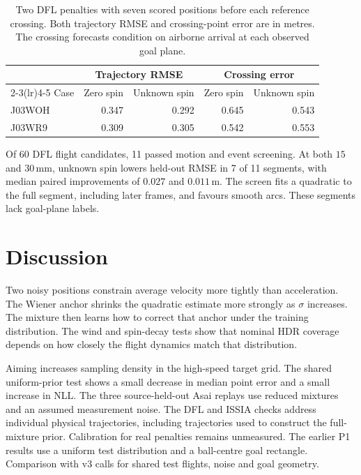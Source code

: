 \documentclass[11pt,a4paper]{article}
\begin{document}
\begin{table}[htbp]
  \centering
  \caption{Two DFL penalties with seven scored positions before each reference crossing. Both trajectory RMSE and crossing-point error are in metres. The crossing forecasts condition on airborne arrival at each observed goal plane.}
  \label{tab:dfl}
  \begin{tabular}{lrrrr}
    \toprule
    & \multicolumn{2}{c}{Trajectory RMSE} & \multicolumn{2}{c}{Crossing error} \\
    \cmidrule(lr){2-3}\cmidrule(lr){4-5}
    Case & Zero spin & Unknown spin & Zero spin & Unknown spin \\
    \midrule
    J03WOH & 0.347 & 0.292 & 0.645 & 0.543 \\
    J03WR9 & 0.309 & 0.305 & 0.542 & 0.553 \\
    \bottomrule
  \end{tabular}
\end{table}

Of 60 DFL flight candidates, 11 passed motion and event screening. At both $15$ and $30\,\mathrm{mm}$, unknown spin lowers held-out RMSE in 7 of 11 segments, with median paired improvements of $0.027$ and $0.011\,\mathrm{m}$. The screen fits a quadratic to the full segment, including later frames, and favours smooth arcs. These segments lack goal-plane labels.


\section{Discussion}

Two noisy positions constrain average velocity more tightly than acceleration. The Wiener anchor shrinks the quadratic estimate more strongly as $\sigma$ increases. The mixture then learns how to correct that anchor under the training distribution. The wind and spin-decay tests show that nominal HDR coverage depends on how closely the flight dynamics match that distribution.

Aiming increases sampling density in the high-speed target grid. The shared uniform-prior test shows a small decrease in median point error and a small increase in NLL. The three source-held-out Asai replays use reduced mixtures and an assumed measurement noise. The DFL and ISSIA checks address individual physical trajectories, including trajectories used to construct the full-mixture prior. Calibration for real penalties remains unmeasured. The earlier P1 results use a uniform test distribution and a ball-centre goal rectangle. Comparison with v3 calls for shared test flights, noise and goal geometry.
\end{document}
